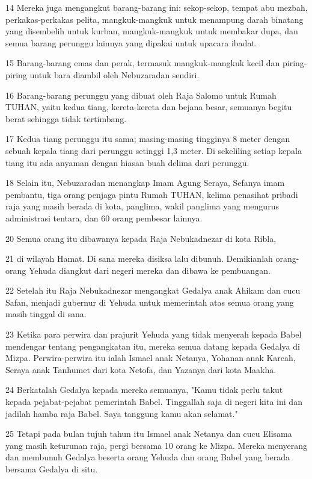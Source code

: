 \par 14 Mereka juga mengangkut barang-barang ini: sekop-sekop, tempat abu mezbah, perkakas-perkakas pelita, mangkuk-mangkuk untuk menampung darah binatang yang disembelih untuk kurban, mangkuk-mangkuk untuk membakar dupa, dan semua barang perunggu lainnya yang dipakai untuk upacara ibadat.
\par 15 Barang-barang emas dan perak, termasuk mangkuk-mangkuk kecil dan piring-piring untuk bara diambil oleh Nebuzaradan sendiri.
\par 16 Barang-barang perunggu yang dibuat oleh Raja Salomo untuk Rumah TUHAN, yaitu kedua tiang, kereta-kereta dan bejana besar, semuanya begitu berat sehingga tidak tertimbang.
\par 17 Kedua tiang perunggu itu sama; masing-masing tingginya 8 meter dengan sebuah kepala tiang dari perunggu setinggi 1,3 meter. Di sekeliling setiap kepala tiang itu ada anyaman dengan hiasan buah delima dari perunggu.
\par 18 Selain itu, Nebuzaradan menangkap Imam Agung Seraya, Sefanya imam pembantu, tiga orang penjaga pintu Rumah TUHAN, kelima penasihat pribadi raja yang masih berada di kota, panglima, wakil panglima yang mengurus administrasi tentara, dan 60 orang pembesar lainnya.
\par 20 Semua orang itu dibawanya kepada Raja Nebukadnezar di kota Ribla,
\par 21 di wilayah Hamat. Di sana mereka disiksa lalu dibunuh. Demikianlah orang-orang Yehuda diangkut dari negeri mereka dan dibawa ke pembuangan.
\par 22 Setelah itu Raja Nebukadnezar mengangkat Gedalya anak Ahikam dan cucu Safan, menjadi gubernur di Yehuda untuk memerintah atas semua orang yang masih tinggal di sana.
\par 23 Ketika para perwira dan prajurit Yehuda yang tidak menyerah kepada Babel mendengar tentang pengangkatan itu, mereka semua datang kepada Gedalya di Mizpa. Perwira-perwira itu ialah Ismael anak Netanya, Yohanan anak Kareah, Seraya anak Tanhumet dari kota Netofa, dan Yazanya dari kota Maakha.
\par 24 Berkatalah Gedalya kepada mereka semuanya, "Kamu tidak perlu takut kepada pejabat-pejabat pemerintah Babel. Tinggallah saja di negeri kita ini dan jadilah hamba raja Babel. Saya tanggung kamu akan selamat."
\par 25 Tetapi pada bulan tujuh tahun itu Ismael anak Netanya dan cucu Elisama yang masih keturunan raja, pergi bersama 10 orang ke Mizpa. Mereka menyerang dan membunuh Gedalya beserta orang Yehuda dan orang Babel yang berada bersama Gedalya di situ.
